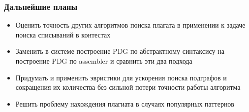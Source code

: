 \documentclass[10pt]{beamer}
\begin{document}
\begin{frame}\frametitle{Дальнейшие планы}
    \begin{itemize}
    	\item Оценить точность других алгоритмов поиска плагата в применении к задаче поиска списываний в контестах
        \item Заменить в системе построение PDG по абстрактному синтаксису на построение PDG по assembler и сравнить эти два подхода
        \item Придумать и применить эвристики для ускорения поиска подграфов и сокращения их количества без сильной потери точности работы алгоритма
        \item Решить проблему нахождения плагиата в случаях популярных паттернов
        
    \end{itemize}
\end{frame}
\end{document}
